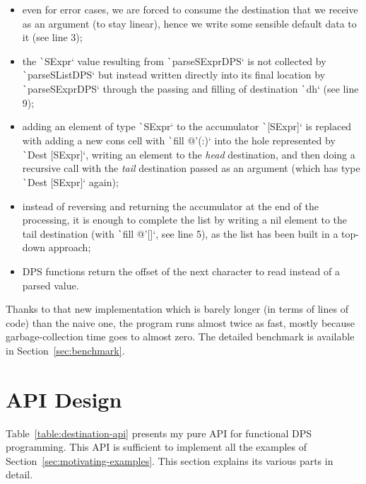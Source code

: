 \documentclass[english]{jflart}
\begin{document}
\begin{itemize}
  \item even for error cases, we are forced to consume the destination that we receive as an argument (to stay linear), hence we write some sensible default data to it (see line 3);
  \item the \texttt`SExpr` value resulting from \texttt`parseSExprDPS` is not collected by \texttt`parseSListDPS` but instead written directly into its final location by \texttt`parseSExprDPS` through the passing and filling of destination \texttt`dh` (see line 9);
  \item adding an element of type \texttt`SExpr` to the accumulator \texttt`[SExpr]` is replaced with adding a new cons cell with \texttt`fill @'(:)` into the hole represented by \texttt`Dest [SExpr]`, writing an element to the \emph{head} destination, and then doing a recursive call with the \emph{tail} destination passed as an argument (which has type \texttt`Dest [SExpr]` again);
  \item instead of reversing and returning the accumulator at the end of the processing, it is enough to complete the list by writing a nil element to the tail destination (with \texttt`fill @'[]`, see line 5), as the list has been built in a top-down approach;
  \item DPS functions return the offset of the next character to read instead of a parsed value.
\end{itemize}

Thanks to that new implementation which is barely longer (in terms of lines of code) than the naive one, the program runs almost twice as fast, mostly because garbage-collection time goes to almost zero. The detailed benchmark is available in Section~\ref{sec:benchmark}.

\section{API Design}\label{sec:api}

Table~\ref{table:destination-api} presents my pure API for functional DPS programming. This API is sufficient to implement all the examples of Section~\ref{sec:motivating-examples}. This section explains its various parts in detail.
\end{document}
